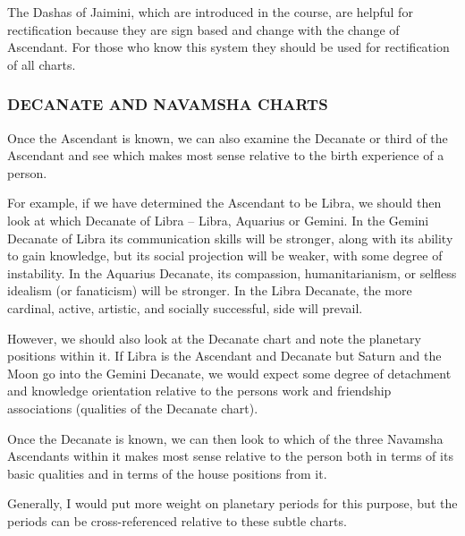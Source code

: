  

The Dashas of Jaimini, which are introduced in the course, are helpful for rectification because they are sign based and change with the change of Ascendant. For those who know this system they should be used for rectification of all charts.

 

\subsubsection{DECANATE AND NAVAMSHA CHARTS}

 

Once the Ascendant is known, we can also examine the Decanate or third of the Ascendant and see which makes most sense relative to the birth experience of a person.
 

For example, if we have determined the Ascendant to be Libra, we should then look at which Decanate of Libra – Libra, Aquarius or Gemini. In the Gemini Decanate of Libra its communication skills will be stronger, along with its ability to gain knowledge, but its social projection will be weaker, with some degree of instability. In the Aquarius Decanate, its compassion, humanitarianism, or selfless idealism (or fanaticism) will be stronger. In the Libra Decanate, the more cardinal, active, artistic, and socially successful, side will prevail.

 

However, we should also look at the Decanate chart and note the planetary positions within it. If Libra is the Ascendant and Decanate but Saturn and the Moon go into the Gemini Decanate, we would expect some degree of detachment and knowledge orientation relative to the persons work and friendship associations (qualities of the Decanate chart).

 

Once the Decanate is known, we can then look to which of the three Navamsha Ascendants within it makes most sense relative to the person both in terms of its basic qualities and in terms of the house positions from it.
 

Generally, I would put more weight on planetary periods for this purpose, but the periods can be cross-referenced relative to these subtle charts.

 

